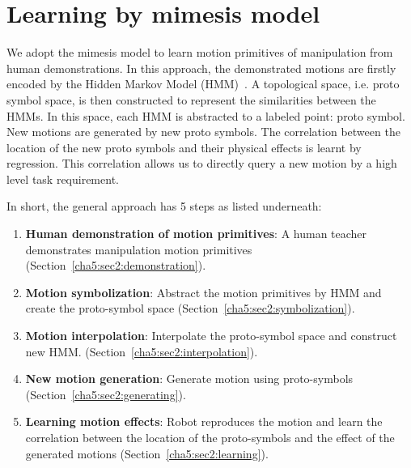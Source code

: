 \section{Learning by mimesis model}
\label{cha5:sec2}

We adopt the mimesis model to learn motion primitives of manipulation from human demonstrations. In this approach, the demonstrated motions are firstly encoded by the Hidden Markov Model (HMM)~\citep{rabiner1989tutorial}. A topological space, i.e. proto symbol space, is then constructed to represent the similarities between the HMMs. In this space, each HMM is abstracted to a labeled point: proto symbol. New motions are generated by new proto symbols. The correlation between the location of the new proto symbols and their physical effects is learnt by regression. This correlation allows us to directly query a new motion by a high level task requirement.

In short, the general approach has 5 steps as listed underneath:

\begin{enumerate}
\item {\bf{Human demonstration of motion primitives}}: A human teacher demonstrates manipulation motion primitives (Section~\ref{cha5:sec2:demonstration}).
\item {\bf{Motion symbolization}}: Abstract the motion primitives by HMM and create the proto-symbol space (Section~\ref{cha5:sec2:symbolization}).
\item {\bf{Motion interpolation}}: Interpolate the proto-symbol space and construct new HMM.  (Section~\ref{cha5:sec2:interpolation}).
\item {\bf{New motion generation}}: Generate motion using proto-symbols (Section~\ref{cha5:sec2:generating}).
\item {\bf{Learning motion effects}}: Robot reproduces the motion and learn the correlation between the location of the proto-symbols and the effect of the generated motions (Section~\ref{cha5:sec2:learning}).
\end{enumerate}



